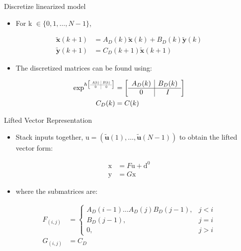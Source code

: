 \documentclass[handout]{beamer}
\newcommand{\state}{\mathbf{x}} %
\newcommand{\sysInput}{\mathbf{u}} %
\newcommand{\observations}{\mathbf{y}} %
\newcommand{\liftedinput}{\mathrm{u}}
\newcommand{\liftedstate}{\mathrm{x}}
\newcommand{\liftedobs}{\mathrm{y}}
\newcommand{\disturbance}{\mathrm{d}}
\newcommand\scalemath[2]{\scalebox{#1}{\mbox{\ensuremath{\displaystyle #2}}}} %
\begin{document}
\begin{frame}{Discretize linearized model}
\begin{itemize}
\item For k $\in \{ 0, 1, \ldots, N-1 \}$, \pause
\end{itemize}
\begin{equation*}
\begin{aligned}
\tilde{\state}(k+1) &= A_{D}(k)\tilde{\state}(k) + B_{D}(k)\tilde{\observations}(k) \\
\tilde{\observations}(k+1) &= C_{D}(k+1)\tilde{\state}(k+1)
\end{aligned}
\end{equation*}
\pause
\begin{itemize}
\item The discretized matrices can be found using: \pause
\linebreak
\end{itemize}
\begin{equation*}
\begin{aligned}
\exp^{h
\left[
\scalemath{0.5}{
\begin{array}{c|c}
A(k) & B(k) \\ \hline
0 & 0
\end{array}}\right]}
&= 
\left[
\begin{array}{c|c}
A_{D}(k) & B_{D}(k) \\ \hline
0 & I
\end{array}\right] \\
C_{D}(k) &= C(k)
\end{aligned}
\end{equation*}
\end{frame}
%
\begin{frame}{Lifted Vector Representation}
\begin{itemize}
\item Stack inputs together, $\liftedinput = (\tilde{\sysInput}(1), \ldots, \tilde{\sysInput}(N-1))$ to obtain the lifted vector form: \pause
\end{itemize}
\begin{equation*}
\begin{aligned}
\liftedstate &= F\liftedinput + \disturbance^{0} \\
\liftedobs &= G\liftedstate  
\end{aligned}
\end{equation*}
\pause
\begin{itemize}
\item where the submatrices are: \pause
\linebreak
\end{itemize}
\begin{equation*}
\begin{aligned}
F_{(i,j)} &= \left \{
\begin{array}{cc}
A_{D}(i-1)\ldots A_{D}(j)B_{D}(j-1), & j < i \\ 
B_{D}(j-1), & j = i \\
0, & j > i 
\end{array} \right. \\
G_{(i,j)} &= C_{D}
\end{aligned}
\end{equation*}
\end{frame}
\end{document}
